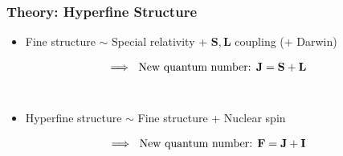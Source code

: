 \documentclass{beamer}
\theoremstyle{definition}
\begin{document}
\begin{frame}
\frametitle{Theory: Hyperfine Structure}


\begin{itemize}
	\item Fine structure $\sim$  Special relativity + $\mathbf{S},\mathbf{L}$ coupling (+ Darwin) 
	
	
	\begin{equation*}
	\hspace{-20 pt} \implies\text{ New quantum number: }
	\mathbf{J} = \mathbf{S} + \mathbf{L}
	\end{equation*}
	$\,$\\
	
	\pause
	
	\item Hyperfine structure $\sim$ Fine structure + Nuclear spin 
	
	\begin{equation*}
	\hspace{-20 pt}\implies\text{ New quantum number: } 
	\mathbf{F} = \mathbf{J} + \mathbf{I}
	\end{equation*}
\end{itemize}

\end{frame}
\end{document}
